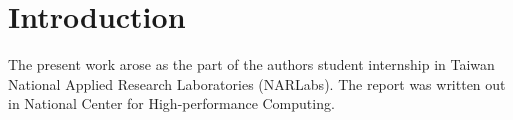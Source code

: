 \cleardoublepage
{}
\section{Introduction}
\label{sec:intro}

The present work arose as the part of the authors student internship in Taiwan National Applied Research Laboratories (NARLabs). The report was written out in National Center for High-performance Computing. 

